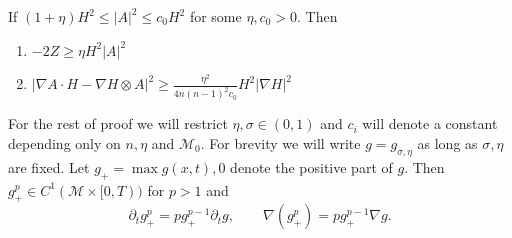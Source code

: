 \begin{comment}
    Also, \begin{align*}
        \nabla g & = \nabla \left[ (|A|^{2}- (1+\eta)H^{2})H^{\sigma -2}\right] \\
        & = (\nabla|A|^{2}- 2(1+\eta)H\nabla H)H^{\sigma -2} + (\sigma -2)(|A|^{2}- (1+\eta)H^{2})H^{\sigma -3}\nabla H \\
        & = (\nabla|A|^{2})H^{\sigma -2} + (\sigma -2)|A|^{2}H^{\sigma -3}\nabla H - \sigma(1+\eta)H^{\sigma -1}\nabla H
    \end{align*}
    which implies \begin{align*}
        \left< \nabla H, \nabla g \right>& = \left< \nabla |A|^{2}, \nabla H \right>H^{\sigma -2} + (\sigma -2)|A|^{2}|\nabla H|^{2}H^{\sigma -3} - \sigma (1+ \eta)|\nabla H|^{2}H^{\sigma -1}
    \end{align*}
\end{proof}
\end{comment}


 

    

\begin{lemma}\cite{huisken1999mean} \label{tensored}
    If $ (1+\eta)H^{2} \le |A|^{2} \le c_{0}H^{2} $ for some $ \eta, c_{0} >0 $. Then 
    \begin{enumerate}
        \item $ -2Z \ge \eta H^{2}|A|^{2} $
        \item $ |\nabla A \cdot H - \nabla H \otimes A|^{2} \ge \frac{\eta^{2}}{4n(n-1)^{2}c_{0}}H^{2}|\nabla H|^{2} $
    \end{enumerate}
\end{lemma}

For the rest of proof we will restrict $ \eta, \sigma \in (0,1) $ and $ c_{i} $ will denote a constant depending only on $ n, \eta $ and $ \mathcal{M}_{0} $. For brevity we will write $ g = g_{\sigma,\eta} $ as long as $ \sigma, \eta $ are fixed. Let $ g_{+}= \max{g(x,t),0} $ denote the positive part of $ g $. Then $ g_{+}^{p} \in C^{1}( \mathcal{M} \times [0,T)) $ for $ p>1 $ and 
\[ \partial_{t}g_{+}^{p} = pg_{+}^{p-1}\partial_{t}g, \qquad \nabla (g_{+}^{p}) =p g_{+}^{p-1}\nabla g. \]

